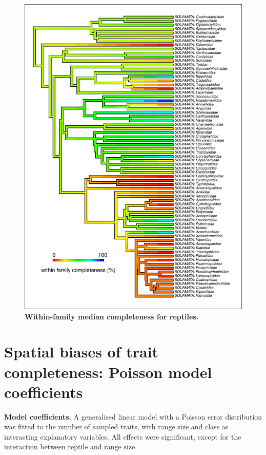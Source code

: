 \documentclass[11pt]{article}
\begin{document}
\pagebreak

\begin{figure}[h!]
\centering
\includegraphics[scale=1.2]{figures/NA_phylo_patterns/Reptiles_completeness}
\caption[Within-family median completeness for reptiles]{\textbf{Within-family median completeness for reptiles.}}
\label{}
\end{figure}



\clearpage

\section{Spatial biases of trait completeness: Poisson model coefficients}
\begin{table}[h!]
\renewcommand{\baselinestretch}{1}
\renewcommand{\arraystretch}{1.2}
\begin{center}\fontsize{9}{11}\selectfont
\caption[Model coefficients]{\textbf{Model coefficients.} A generalised linear model with a Poisson error distribution was fitted to the number of sampled traits, with range size and class as interacting explanatory variables. All effects were significant, except for the interaction between reptile and range size.}
\end{center}
\label{Poisson_model_coef}
\end{table}
\end{document}
